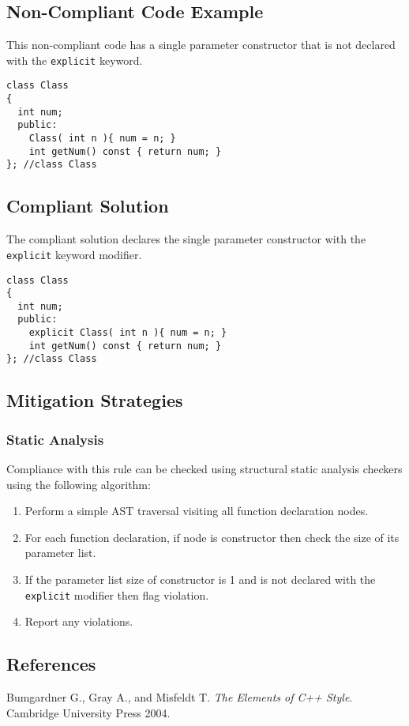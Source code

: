 \subsection{Non-Compliant Code Example}
This non-compliant code has a single parameter constructor that is not declared with the {\tt explicit} keyword.

\begin{verbatim}
class Class
{
  int num;
  public:
    Class( int n ){ num = n; }
    int getNum() const { return num; }
}; //class Class
\end{verbatim}

\subsection{Compliant Solution}
The compliant solution declares the single parameter constructor with the {\tt explicit} keyword modifier.

\begin{verbatim}
class Class
{
  int num;
  public:
    explicit Class( int n ){ num = n; }
    int getNum() const { return num; }
}; //class Class
\end{verbatim}

\subsection{Mitigation Strategies}
\subsubsection{Static Analysis} 

Compliance with this rule can be checked using structural static analysis checkers using the following algorithm:

\begin{enumerate}
\item Perform a simple AST traversal visiting all function declaration nodes.
\item For each function declaration, if node is constructor then check the size of its parameter list.
\item If the parameter list size of constructor is 1 and is not declared with the {\tt explicit} modifier then flag violation.
\item Report any violations. 
\end{enumerate}

\subsection{References}

Bumgardner G., Gray A., and Misfeldt T. {\it The Elements of C++ Style}. Cambridge University Press 2004.

